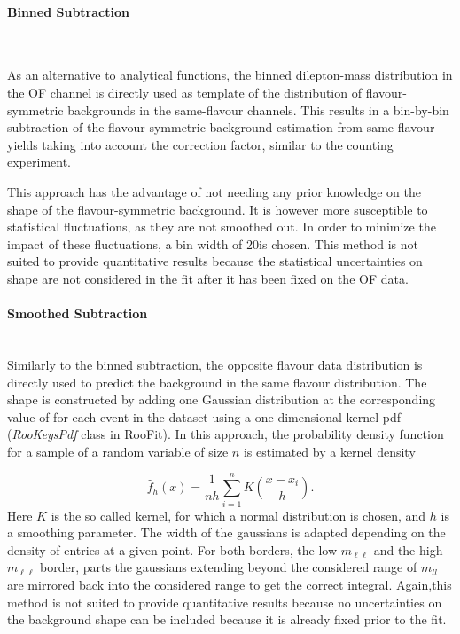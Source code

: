 \paragraph{Binned Subtraction}\mbox{} \\


\label{shapesubtraction:binnedsubtraction}

As an alternative to analytical functions, the binned dilepton-mass distribution in the OF channel is directly used as  template of the distribution of flavour-symmetric backgrounds in the same-flavour channels. This results in a bin-by-bin subtraction of the flavour-symmetric background estimation from same-flavour yields taking into account the \Rsfof correction factor, similar to the counting experiment.

This approach has the advantage of not needing any prior knowledge on the shape of the flavour-symmetric background. It is however more susceptible to statistical fluctuations, as they are not smoothed out. In order to minimize the impact of these fluctuations, a bin width of 20\GeV is chosen. This method is not suited to provide quantitative results because the statistical uncertainties on shape are not considered in the fit after it has been fixed on the OF data.

\paragraph{Smoothed Subtraction}\mbox{} \\
Similarly to the binned subtraction, the opposite flavour data distribution is directly used to predict the background in the same flavour distribution. The shape is constructed by adding one Gaussian distribution at the corresponding value of \mll for each event in the dataset using a one-dimensional kernel pdf (\emph{RooKeysPdf} class in RooFit). In this approach, the probability density function for a sample of a random variable of size $n$ is estimated by a kernel density

\begin{equation}
\hat{f}_h(x) = \frac{1}{nh}\sum\limits_{i=1}^n K(\frac{x-x_i}{h}).
\end{equation}
Here $K$ is the so called kernel, for which a normal distribution is chosen, and $h$ is a smoothing parameter\cite{kernelDensity}. The width of the gaussians is adapted depending on the density of entries at a given point. For both borders, the low-$m_{\ell\ell}$ and the high-$m_{\ell\ell}$ border, parts the gaussians extending beyond the considered range of $m_{ll}$ are mirrored back into the considered range to get the correct integral. Again,this method is not suited to provide quantitative results because no uncertainties on the background shape can be included because it is already fixed prior to the fit.  

